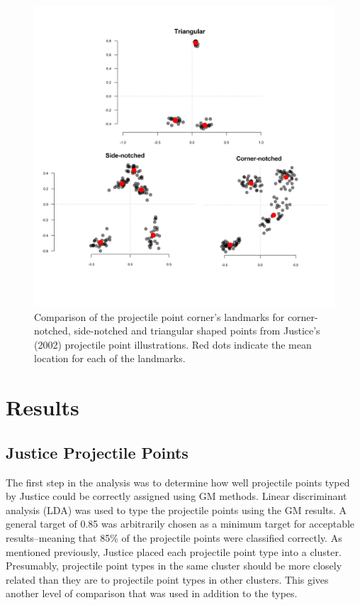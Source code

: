 \documentclass[a4paper]{article}
\begin{document}
\begin{figure}
\includegraphics[width=1\linewidth]{figures/cornerComparison} \caption{Comparison of the projectile point corner's landmarks for corner-notched, side-notched and triangular shaped points from Justice's (2002) projectile point illustrations. Red dots indicate the mean location for each of the landmarks.}\label{fig:cornerComparison}
\end{figure}

\hypertarget{results}{%
\section*{Results}\label{results}}

\hypertarget{justice-projectile-points}{%
\subsection*{Justice Projectile Points}\label{justice-projectile-points}}

The first step in the analysis was to determine how well projectile points typed by Justice could be correctly assigned using GM methods. Linear discriminant analysis (LDA) was used to type the projectile points using the GM results. A general target of 0.85 was arbitrarily chosen as a minimum target for acceptable results--meaning that 85\% of the projectile points were classified correctly. As mentioned previously, Justice placed each projectile point type into a cluster. Presumably, projectile point types in the same cluster should be more closely related than they are to projectile point types in other clusters. This gives another level of comparison that was used in addition to the types.
\end{document}
